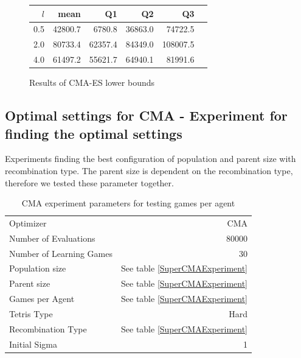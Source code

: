 \begin{figure}[H]
\centering
\begin{tabular}{r | r r r r r}
$l$ & mean & Q1 & Q2 & Q3\\
\hline
0.5 & 42800.7 & 6780.8  & 36863.0 & 74722.5\\
2.0 & 80733.4 & 62357.4 & 84349.0 & 108007.5\\
4.0 & 61497.2 & 55621.7 & 64940.1 & 81991.6\\
\end{tabular}
\caption{Results of CMA-ES lower bounds \label{appendixCMALowerBoundConfigTest}}
\end{figure}





\clearpage

\subsection{Optimal settings for CMA - Experiment for finding the optimal settings \label{appendixCMAPopulationParent}}
Experiments finding the best configuration of population and parent size with recombination type. The parent size is dependent on the recombination type, therefore we tested these parameter together.
\begin{table}[h]
\centering
\begin{tabular}{l r}
Optimizer & CMA\\
Number of Evaluations & 80000\\
Number of Learning Games &30\\
Population size& See table \ref{SuperCMAExperiment}\\
Parent size & See table \ref{SuperCMAExperiment}\\
Games per Agent & See table \ref{SuperCMAExperiment}\\
Tetris Type & Hard\\
\hline
Recombination Type & See table \ref{SuperCMAExperiment}\\
Initial Sigma & 1
\end{tabular}
\caption{CMA experiment parameters for testing games per agent}
\end{table}

